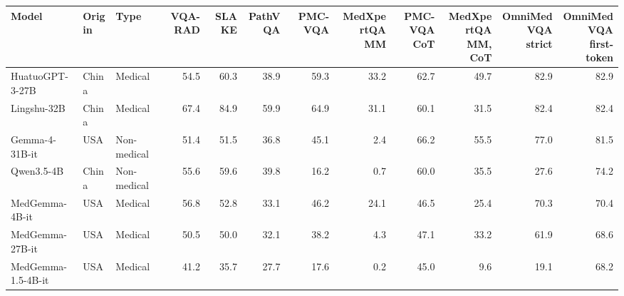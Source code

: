 \begin{tabular}{@{}lllrrrrrrrrr@{}}
\toprule
Model & Origin & Type & VQA-RAD & SLAKE & PathVQA & PMC-VQA & \thead{MedXpertQA\\MM} & \thead{PMC-VQA\\CoT} & \thead{MedXpertQA\\MM, CoT} & \thead{OmniMedVQA\\strict} & \thead{OmniMedVQA\\first-token} \\
\midrule
HuatuoGPT-3-27B & China & Medical & 54.5 & 60.3 & 38.9 & 59.3 & 33.2 & 62.7 & 49.7 & 82.9 & 82.9 \\
Lingshu-32B & China & Medical & 67.4 & 84.9 & 59.9 & 64.9 & 31.1 & 60.1 & 31.5 & 82.4 & 82.4 \\
Gemma-4-31B-it & USA & Non-medical & 51.4 & 51.5 & 36.8 & 45.1 & 2.4 & 66.2 & 55.5 & 77.0 & 81.5 \\
Qwen3.5-4B & China & Non-medical & 55.6 & 59.6 & 39.8 & 16.2 & 0.7 & 60.0 & 35.5 & 27.6 & 74.2 \\
MedGemma-4B-it & USA & Medical & 56.8 & 52.8 & 33.1 & 46.2 & 24.1 & 46.5 & 25.4 & 70.3 & 70.4 \\
MedGemma-27B-it & USA & Medical & 50.5 & 50.0 & 32.1 & 38.2 & 4.3 & 47.1 & 33.2 & 61.9 & 68.6 \\
MedGemma-1.5-4B-it & USA & Medical & 41.2 & 35.7 & 27.7 & 17.6 & 0.2 & 45.0 & 9.6 & 19.1 & 68.2 \\
\bottomrule
\end{tabular}
